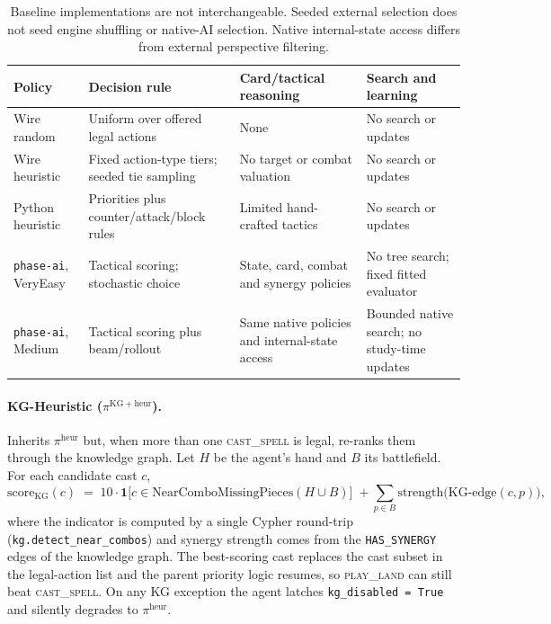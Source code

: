 \documentclass[11pt,a4paper]{article}
\theoremstyle{definition}
\theoremstyle{plain}
\begin{document}
\begin{table}[ht]
\centering
\small
\begin{tabularx}{\linewidth}{lXXX}
\toprule
Policy & Decision rule & Card/tactical reasoning & Search and learning \\
\midrule
Wire random & Uniform over offered legal actions & None & No search or updates \\
Wire heuristic & Fixed action-type tiers; seeded tie sampling & No target or combat valuation & No search or updates \\
Python heuristic & Priorities plus counter/attack/block rules & Limited hand-crafted tactics & No search or updates \\
\texttt{phase-ai}, VeryEasy & Tactical scoring; stochastic choice & State, card, combat and synergy policies & No tree search; fixed fitted evaluator \\
\texttt{phase-ai}, Medium & Tactical scoring plus beam/rollout & Same native policies and internal-state access & Bounded native search; no study-time updates \\
\bottomrule
\end{tabularx}
\caption{Baseline implementations are not interchangeable. Seeded external
selection does not seed engine shuffling or native-AI selection. Native
internal-state access differs from external perspective filtering.}
\label{tab:baseline-policies}
\end{table}

\paragraph{KG-Heuristic ($\pi^{\mathrm{KG\!+\!heur}}$).} Inherits $\pi^{\mathrm{heur}}$ but, when more than one \textsc{cast\_spell} is legal, re-ranks them through the knowledge graph. Let $H$ be the agent's hand and $B$ its battlefield. For each candidate cast $c$,
\begin{equation*}
\mathrm{score}_{\mathrm{KG}}(c) \;=\; 10\cdot \mathbf{1}\!\big[c \in \mathrm{NearComboMissingPieces}(H \cup B)\big] \;+\!\!\sum_{p \in B}\!\!\mathrm{strength}\big(\mathrm{KG\text{-}edge}(c, p)\big),
\end{equation*}
where the indicator is computed by a single Cypher round-trip
(\texttt{kg.detect\_near\_combos}) and synergy strength comes from the
\texttt{HAS\_SYNERGY} edges of the knowledge graph. The best-scoring cast
replaces the cast subset in the legal-action list and the parent
priority logic resumes, so \textsc{play\_land} can still beat
\textsc{cast\_spell}. On any KG exception the agent latches
\texttt{kg\_disabled = True} and silently degrades to $\pi^{\mathrm{heur}}$.
\end{document}
